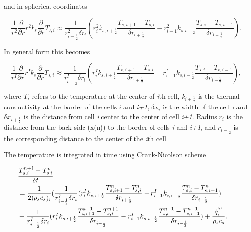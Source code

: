 and in spherical coordinates

\begin{equation}
\label{T_spher}
    \frac{1}{r^2}\frac{\partial}{\partial r} r^2 k_s \frac{\partial}{\partial r} T_{s,i}
    \approx \frac{1}{r^2_{i-\frac{1}{2}} \delta r_i}(r_{i}^2 k_{s,i+\frac{1}{2}}\frac{T_{s,i+1}-T_{s,i}}{\delta r_{i+\frac{1}{2}}}-r^2_{i-1}k_{s,i-\frac{1}{2}}\frac{T_{s,i}-T_{s,i-1}}{\delta r_{i-\frac{1}{2}}}).
\end{equation}

In general form this becomes

\begin{equation}
\label{T_general}
    \frac{1}{r^{I}}\frac{\partial}{\partial r} r^{I}k_s \frac{\partial}{\partial r} T_{s,i}
    \approx \frac{1}{r_{i-\frac{1}{2}}^I \delta r_i}(r_{i}^{I}k_{s,i+\frac{1}{2}}\frac{T_{s,i+1}-T_{s,i}}{\delta r_{i+\frac{1}{2}}}-r_{i-1}^{I}k_{s,i-\frac{1}{2}}\frac{T_{s,i}-T_{s,i-1}}{\delta r_{i-\frac{1}{2}}}),
\end{equation}

where $T_i$ refers to the temperature at the center of \textit{i}th cell, $k_{i+\frac{1}{2}}$ is the thermal conductivity at the border of the cells \textit{i} and \textit{i+1}, $\delta x_i$ is the width of the cell \textit{i} and  $\delta x_{i+\frac{1}{2}}$ is the distance from cell \textit{i} center to the center of cell \textit{i+1}. Radius $r_i$ is the distance from the back side (x(n)) to the border of cells \textit{i} and \textit{i+1}, and $r_{i-\frac{1}{2}}$ is the corresponding distance to the center of the \textit{i}th cell.

The temperature is integrated in time using Crank-Nicolson scheme

\begin{eqnarray}
\label{crank-nicolson}
  \lefteqn{\frac{T_{s,i}^{n+1}-T_{s,i}^{n}}{\delta t}}\nonumber\\
 & = \frac{1}{2(\rho_s c_s)_i}(\frac{1}{r_{i-\frac{1}{2}}^I \delta r_i}(r_{i}^{I}k_{s,i+\frac{1}{2}}\frac{T_{s,i+1}^{n}-T_{s,i}^{n}}{\delta r_{i+\frac{1}{2}}}-r_{i-1}^{I}k_{s,i-\frac{1}{2}}\frac{T_{s,i}^{n}-T_{s,i-1}^{n}}{\delta r_{i-\frac{1}{2}}})\nonumber\\
&  +\frac{1}{r_{i-\frac{1}{2}}^I \delta r_i}(r_{i}^{I}k_{s,i+\frac{1}{2}}\frac{T_{s,i+1}^{n+1}-T_{s,i}^{n+1}}{\delta r_{i+\frac{1}{2}}}-r_{i-1}^{I}k_{s,i-\frac{1}{2}}\frac{T_{s,i}^{n+1}-T_{s,i-1}^{n+1}}{\delta r_{i-\frac{1}{2}}}) +\frac{\dot{q}^{'''}_s}{\rho_s c_s}.\\\nonumber
\end{eqnarray}

